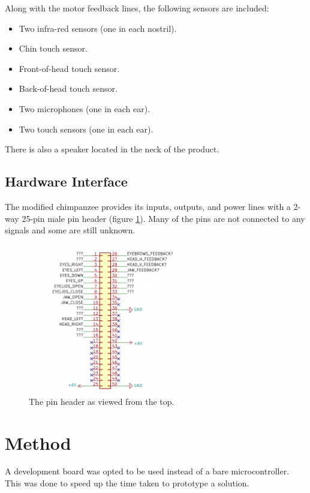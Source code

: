 \documentclass[11pt]{article} %
\begin{document}
Along with the motor feedback lines, the following sensors are included:
\begin{itemize}
	\item Two infra-red sensors (one in each nostril).
	\item Chin touch sensor.
	\item Front-of-head touch sensor.
	\item Back-of-head touch sensor.
	\item Two microphones (one in each ear).
	\item Two touch sensors (one in each ear).
\end{itemize}

There is also a speaker located in the neck of the product.

\subsection{Hardware Interface}

The modified chimpanzee provides its inputs, outputs, and power lines with a 2-way 25-pin male pin header (figure \ref{fig:pinheader}).
Many of the pins are not connected to any signals and some are still unknown.

\begin{figure}[h]
	\center
	\includegraphics[width=0.6\textwidth]{pinheader}
	\caption{The pin header as viewed from the top.}
	\label{fig:pinheader}
\end{figure}

\section{Method}

A development board was opted to be used instead of a bare microcontroller.
This was done to speed up the time taken to prototype a solution.
\end{document}
